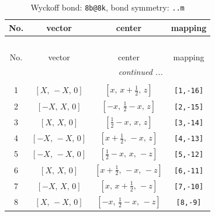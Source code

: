 \documentclass[fleqn,8pt]{jsarticle}
\begin{document}
\begin{longtable}{cccc}
\caption{Wyckoff bond: {\tt 8b@8k}, bond symmetry: {\tt ..m}}
 \\
 \hline \hline
No. & vector & center & mapping \\ \hline \endfirsthead

\multicolumn{3}{l}{\tablename\ \thetable{}} \\
 \hline \hline
No. & vector & center & mapping \\ \hline \endhead

 \hline \hline
\multicolumn{3}{r}{\footnotesize\it continued ...} \\ \endfoot

 \hline \hline
\multicolumn{3}{r}{} \\ \endlastfoot

1 & $\left[ X,\, - X,\, 0 \right]$ & $\left[ x,\, x + \frac{1}{2},\, z \right]$ & {\tt [1,-16]} \\ \hline
2 & $\left[ - X,\, X,\, 0 \right]$ & $\left[ - x,\, \frac{1}{2} - x,\, z \right]$ & {\tt [2,-15]} \\ \hline
3 & $\left[ X,\, X,\, 0 \right]$ & $\left[ \frac{1}{2} - x,\, x,\, z \right]$ & {\tt [3,-14]} \\ \hline
4 & $\left[ - X,\, - X,\, 0 \right]$ & $\left[ x + \frac{1}{2},\, - x,\, z \right]$ & {\tt [4,-13]} \\ \hline
5 & $\left[ - X,\, - X,\, 0 \right]$ & $\left[ \frac{1}{2} - x,\, x,\, - z \right]$ & {\tt [5,-12]} \\ \hline
6 & $\left[ X,\, X,\, 0 \right]$ & $\left[ x + \frac{1}{2},\, - x,\, - z \right]$ & {\tt [6,-11]} \\ \hline
7 & $\left[ - X,\, X,\, 0 \right]$ & $\left[ x,\, x + \frac{1}{2},\, - z \right]$ & {\tt [7,-10]} \\ \hline
8 & $\left[ X,\, - X,\, 0 \right]$ & $\left[ - x,\, \frac{1}{2} - x,\, - z \right]$ & {\tt [8,-9]} \\
\end{longtable}
\renewcommand{\arraystretch}{1.2}
\end{document}
